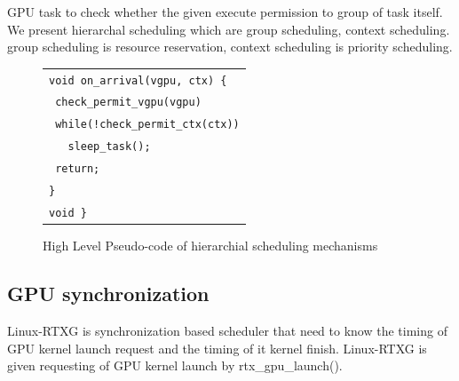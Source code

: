 GPU task to check whether the given execute permission to group of task itself.
We present hierarchal scheduling which are group scheduling, context scheduling.
group scheduling is resource reservation, context scheduling is priority scheduling.
\begin{figure}[t]
\begin{center}
\begin{tabular}{l}
\hline\hline
{\scriptsize \verb|void on_arrival(vgpu, ctx) {|}\\
{\scriptsize \verb| check_permit_vgpu(vgpu)    |}\\
{\scriptsize \verb| while(!check_permit_ctx(ctx))|}\\
{\scriptsize \verb|   sleep_task(); |}\\
{\scriptsize \verb| return;|}\\
{\scriptsize \verb|}|}\\
{\scriptsize \verb|void }|}\\
\hline
\end{tabular}
\caption{High Level Pseudo-code of hierarchial scheduling mechanisms}
\label{fig:band}
\end{center}
\end{figure}


\subsection{GPU synchronization}
Linux-RTXG is synchronization based scheduler that need to know the timing of GPU kernel launch request and the timing of it kernel finish.
Linux-RTXG is given requesting of GPU kernel launch by rtx\_gpu\_launch().



